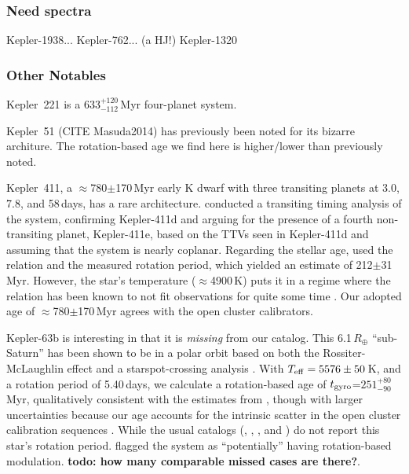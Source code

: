 \documentclass[11pt,twocolumn,tighten]{aastex63}
\begin{document}
\subsubsection{Need spectra}
Kepler-1938...
Kepler-762... (a HJ!)
Kepler-1320

\subsubsection{Other Notables}

Kepler~221 is a 633$^{+120}_{-112}$\,Myr four-planet system.

Kepler~51 (CITE Masuda2014) has previously been noted for its bizarre architure.
The rotation-based age we find here is higher/lower than previously noted.

Kepler~411, a $\approx$780$\pm$170\,Myr early K dwarf with three
transiting planets at 3.0, 7.8, and 58\,days, has a rare
architecture.  \citet{2019A&A...624A..15S} conducted a transiting
timing analysis of the system, confirming Kepler-411d and arguing for
the presence of a fourth non-transiting planet, Kepler-411e, based on
the TTVs seen in Kepler-411d and assuming that the system is nearly
coplanar.  Regarding the stellar age, \citet{2019A&A...624A..15S} used
the \citet{2007ApJ...669.1167B} relation and the measured rotation
period, which yielded an estimate of 212$\pm$31\,Myr.  However, the
star's temperature ($\approx$4900\,K) puts it in a regime where the
\citeauthor{2007ApJ...669.1167B} relation has been known to not fit
observations for quite some time
\citep[e.g.][Fig.~9]{2008ApJ...687.1264M}.  Our adopted age of
$\approx$780$\pm$170\,Myr agrees with the open cluster calibrators.

Kepler-63b is interesting in that it is {\it missing} from our
catalog.  This 6.1\,$R_\oplus$ ``sub-Saturn'' has been shown to be in
a polar orbit based on both the Rossiter-McLaughlin effect and a
starspot-crossing analysis \citep{2013ApJ...775...54S}.  With $T_{\rm
eff}=5576\pm50$\,K, and a rotation period of 5.40\,days, we calculate
a rotation-based age of $t_{\rm gyro}$=$251^{+80}_{-90}$\,Myr,
qualitatively consistent with the estimates from
\citet{2013ApJ...775...54S}, though with larger uncertainties because
our age accounts for the intrinsic scatter in the open cluster
calibration sequences \citep{Bouma_2023}.  
While the usual catalogs (,
, , and
) do not report this star's rotation period.
 flagged the system as ``potentially'' having
rotation-based modulation.
{\bf todo: how many comparable missed cases are there?}.
%
\end{document}
